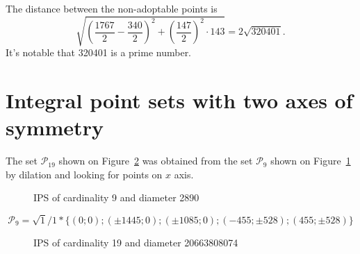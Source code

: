 \documentclass[12pt]{article}
\theoremstyle{theorem}
\theoremstyle{dfn}
\theoremstyle{remark}
\begin{document}
The distance between the non-adoptable points is
\begin{equation}
	\sqrt{\left(\frac{1767}{2} - \frac{340}{2}\right)^2 + \left(\frac{147}{2}\right)^2\cdot143} = 2\sqrt{320401}
	.
\end{equation}
It's notable that 320401 is a prime number.

\section{Integral point sets with two axes of symmetry}

The set $\mathcal{P}_{19}$ shown on Figure~\ref{19_20663808074} was obtained from the set $\mathcal{P}_{9}$ shown on Figure~\ref{9_2890_1_02e6af}
by dilation and looking for points on $x$ axis.


\begin{figure}[h!]
\parbox{1\linewidth}{\caption{IPS of cardinality 9 and diameter 2890}
\label{9_2890_1_02e6af}}
\end{figure}

\begin{equation}
	\mathcal{P}_9=\sqrt{1}/1*\{
	( 0 ; 0);
	( \pm1445 ; 0);
	( \pm1085 ; 0);
	( -455 ; \pm528);
	( 455 ; \pm528)
	\}
\end{equation}

\begin{figure}[h!]
\parbox{1\linewidth}{\caption{IPS of cardinality 19 and diameter 20663808074}
\label{19_20663808074}}
\end{figure}
\end{document}
